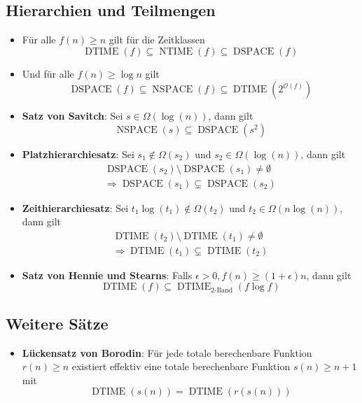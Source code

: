 \subsection{Hierarchien und Teilmengen}
\begin{itemize}
	\item Für alle $f(n)\geq n$ gilt für die Zeitklassen
	\begin{equation*}
		\operatorname{DTIME}(f)\subseteq\operatorname{NTIME}(f)\subseteq\operatorname{DSPACE}(f)
	\end{equation*}
	\item Und für alle $f(n)\geq \log n$ gilt
	\begin{equation*}
		\operatorname{DSPACE}(f)\subseteq\operatorname{NSPACE}(f)\subseteq\operatorname{DTIME}(2^{\mathcal O(f)})
	\end{equation*}
	\item \textbf{Satz von Savitch}: Sei $s\in\Omega(\log(n))$, dann gilt
	\begin{equation*}
		\operatorname{NSPACE}(s)\subseteq\operatorname{DSPACE}(s^2)
	\end{equation*}
	\item \textbf{Platzhierarchiesatz}: Sei $s_1\not\in\Omega(s_2)$ und $s_2\in\Omega(\log(n))$, dann gilt
	\begin{gather*}
		\operatorname{DSPACE}(s_2)\setminus\operatorname{DSPACE}(s_1)\not=\emptyset\\
		\Rightarrow \operatorname{DSPACE}(s_1)\subsetneq\operatorname{DSPACE}(s_2)
	\end{gather*}
	\item \textbf{Zeithierarchiesatz}: Sei $t_1\log(t_1)\not\in\Omega(t_2)$ und $t_2\in\Omega(n\log(n))$, dann gilt
	\begin{gather*}
		\operatorname{DTIME}(t_2)\setminus\operatorname{DTIME}(t_1)\not=\emptyset\\
		\Rightarrow \operatorname{DTIME}(t_1)\subsetneq \operatorname{DTIME}(t_2)
	\end{gather*}
	\item \textbf{Satz von Hennie und Stearns}: Falls $\epsilon>0, f(n)\geq (1+\epsilon)n$, dann gilt
	\begin{equation*}
		\operatorname{DTIME}(f)\subseteq\operatorname{DTIME}_{\text{2-Band}}(f\log f)
	\end{equation*}
\end{itemize}

\subsection{Weitere Sätze}
\begin{itemize}
	\item \textbf{Lückensatz von Borodin}: Für jede totale berechenbare Funktion $r(n)\geq n$ existiert effektiv eine totale berechenbare Funktion $s(n)\geq n+1$ mit
	\begin{equation*}
		\operatorname{DTIME}(s(n))=\operatorname{DTIME}(r(s(n)))
	\end{equation*}
\end{itemize}


